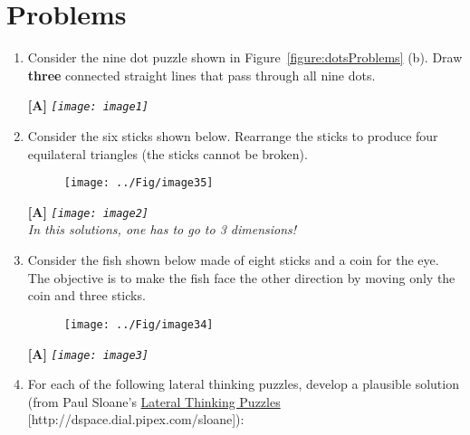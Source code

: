 \section{Problems}
\label{section:conceptGenProblems}
\graphicspath{ {./chapter04/FigSolutions} }

\begin{enumerate}
\def\labelenumi{\arabic{enumi}.}
\item
  Consider the nine dot puzzle shown in Figure~\ref{figure:dotsProblems} (b). Draw
    \textbf{three} connected straight lines that pass through all nine
    dots.
    
    \begin{onlysolution}
    \textbf{[A]}
    \itshape
    \texttt{[image: image1]}
  \end{onlysolution}

\item
  Consider the six sticks shown below. Rearrange the sticks to produce
  four equilat­eral triangles (the sticks cannot be broken).
  
  \begin{figure}[h]
    \texttt{[image: ../Fig/image35]}
    \label{figure:sixSticks}
    \end{figure}

    \begin{onlysolution}
    \textbf{[A]}
    \itshape
    \texttt{[image: image2]} \\
    In this solutions, one has to go to 3 dimensions!
  \end{onlysolution}

\item
  Consider the fish shown below made of eight sticks and a coin for the
  eye. The objective is to make the fish face the other direction by
  moving only the coin and three sticks.

  \begin{figure}[h]
  \texttt{[image: ../Fig/image34]}
  \label{figure:fishStickFigure}
  \end{figure}

  \begin{onlysolution}
    \textbf{[A]}
    \itshape
    \texttt{[image: image3]}
  \end{onlysolution}

\item
  For each of the following lateral thinking puzzles, develop a
  plausible solution (from Paul Sloane's \ul{Lateral Thinking Puzzles}
  {[}http://dspace.dial.pipex.com/sloane{]}):


\end{enumerate}
